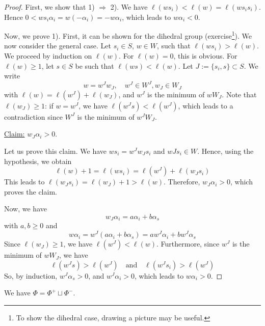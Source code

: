 \documentclass[envcountsame,envcountchap]{svmono}
\begin{document}
\begin{proof}
First, we show that 1) $\Rightarrow$ 2). We have $\ell (w s_i) < \ell (w) = \ell (w s_i s_i)$. Hence $0 < w s_i \alpha_i = w (-\alpha_i) = - w \alpha_i$, which leads to $w \alpha_i <0$. 

Now, we prove 1). First, it can be shown for the dihedral group (exercise\footnote{To show the dihedral case, drawing a picture may be useful.}). We now consider the general case. Let $s_i \in S$, $w\in W$, such that $\ell(ws_i) > \ell(w)$. We proceed by induction on $\ell (w)$. For $\ell (w) =0$, this is obvious. For $\ell (w) \ge 1$, let $s \in S$ be such that $\ell (w s) < \ell (w)$. Let $J:= \{s_i, s \} \subset S$. We write 
\begin{equation}
w = w^J w_J, \quad w^J \in W^J, w_J \in W_J 
\end{equation} with $\ell(w) = \ell (w^J ) + \ell (w_J)$, and $w^J$ is the minimum of $w W_J$. Note that $\ell (w_J) \ge 1$: if $w = w^J$, we have $\ell (w^J s) < \ell (w^J)$, which leads to a contradiction since $W^J$ is the minimum of $w^J W_J$. 

\underline{Claim:} $w_J \alpha_i > 0$. 

Let us prove this claim. We have $w s_i  = w^J w_J s_i$ and $wJ s_i \in W$. Hence, using the hypothesis, we obtain 
\begin{equation}
\ell (w) +1 = \ell (w s_i) = \ell (w^J) + \ell (w_J s_i) 
\end{equation} This leads to $\ell (w_J s_i) = \ell (w_J) + 1 > \ell (w)$. Therefore, $w_J \alpha_i > 0$, which proves the claim. 

Now, we have
\begin{equation}
w_J \alpha_i = a \alpha_i + b \alpha_s
\end{equation} with $a, b \ge 0$ and
\begin{equation}
w \alpha_i = w^J (a \alpha_i + b \alpha_s ) = a w^J \alpha_i + b w^J \alpha_s
\end{equation} Since $\ell (w_J) \ge 1$, we have $\ell (w^J) < \ell (w)$. Furthermore, since $w^J$ is the minimum of $w W_J$, we have
\begin{equation}
\ell (w^J s) > \ell (w^J)  \quad \text{and} \quad \ell (w^J s_i) > \ell (w^J)
\end{equation} So, by induction, $w^J \alpha_s > 0$, and $w^J \alpha_i > 0$, which leads to $w \alpha_i > 0$. 

 
\end{proof}	
	
\begin{corollary}
We have $\Phi = \Phi^+ \sqcup \Phi^-$.
\end{corollary}	
\end{document}
